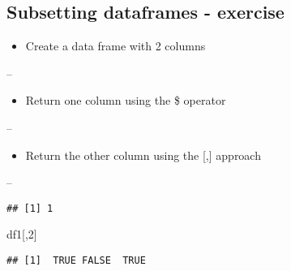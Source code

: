 \documentclass[]{article}
\newenvironment{Shaded}{\begin{snugshade}}{\end{snugshade}}
\newcommand{\DataTypeTok}[1]{\textcolor[rgb]{0.13,0.29,0.53}{#1}}
\newcommand{\DecValTok}[1]{\textcolor[rgb]{0.00,0.00,0.81}{#1}}
\newcommand{\KeywordTok}[1]{\textcolor[rgb]{0.13,0.29,0.53}{\textbf{#1}}}
\newcommand{\NormalTok}[1]{#1}
\newcommand{\OperatorTok}[1]{\textcolor[rgb]{0.81,0.36,0.00}{\textbf{#1}}}
\newcommand{\OtherTok}[1]{\textcolor[rgb]{0.56,0.35,0.01}{#1}}
\newcommand{\StringTok}[1]{\textcolor[rgb]{0.31,0.60,0.02}{#1}}
\providecommand{\tightlist}{%
  \setlength{\itemsep}{0pt}\setlength{\parskip}{0pt}}
\begin{document}
\hypertarget{subsetting-dataframes---exercise}{%
\subsection{Subsetting dataframes -
exercise}\label{subsetting-dataframes---exercise}}

\begin{itemize}
\tightlist
\item
  Create a data frame with 2 columns
\end{itemize}

--

\begin{itemize}
\tightlist
\item
  Return one column using the \$ operator
\end{itemize}

--

\begin{itemize}
\tightlist
\item
  Return the other column using the {[},{]} approach
\end{itemize}

--

\begin{Shaded}
\end{Shaded}

\begin{verbatim}
## [1] 1
\end{verbatim}

\begin{Shaded}
\begin{Highlighting}[]
\NormalTok{df1[,}\DecValTok{2}\NormalTok{]}
\end{Highlighting}
\end{Shaded}

\begin{verbatim}
## [1]  TRUE FALSE  TRUE
\end{verbatim}
\end{document}
